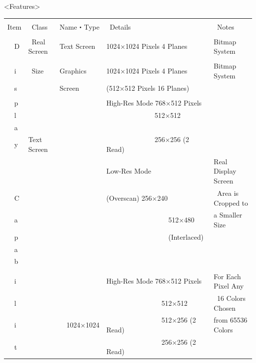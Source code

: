 ﻿\documentclass[twoside,a4paper,12pt]{article}
\begin{document}
\newpage

<Features>

\setlength{\tabcolsep}{0.5mm}
\begin{tabular}{|p{13mm}|p{23mm}|p{4mm}|p{20mm}|p{65mm}|p{36mm}|}
\hline
& & \multicolumn{2}{l|}{} & &\\[-2mm]
Item & \ Class & \multicolumn{2}{l|}{Name・Type} & \ Details & \ Notes\\[1mm]
\hline
& & \multicolumn{2}{l|}{} & &\\[-1mm]
\ \ D & \ Real Screen & \multicolumn{2}{l|}{Text Screen} & 1024×1024 Pixels 4 Planes & Bitmap System\\
\cline{3-6}
& & \multicolumn{2}{l|}{} & &\\[-4mm]
\ \ i & \ Size & \multicolumn{2}{l|}{Graphics} & 1024×1024 Pixels 4 Planes & Bitmap System\\
\ \ s & & \multicolumn{2}{l|}{Screen} & (512×512 Pixels 16 Planes) &\\
\cline{2-6}
& & \multicolumn{2}{l|}{} & &\\[-4mm]
\ \ p & & \multicolumn{2}{l|}{} & High-Res Mode 768×512 Pixels &\\
\ \ l & & \multicolumn{2}{l|}{} & \ \ \ \ \ \ \ \ \ \ \ \ \ \ 512×512 &\\
\ \ a & & \multicolumn{2}{l|}{} & &\\
\ \ y & Text Screen & \multicolumn{2}{l|}{} & \ \ \ \ \ \ \ \ \ \ \ \ \ \ 256×256 (2 Read) &\\
& & \multicolumn{2}{l|}{} & Low-Res Mode & Real Display Screen\\
\ \ C & & \multicolumn{2}{l|}{} & (Overscan) 256×240 & \ Area is Cropped to\\
\ \ a & & \multicolumn{2}{l|}{} & \ \ \ \ \ \ \ \ \ \ \ \ \ \ \ \ \ \ 512×480 & a Smaller Size\\
\ \ p & & \multicolumn{2}{l|}{} & \ \ \ \ \ \ \ \ \ \ \ \ \ \ \ \ \ \ (Interlaced) &\\
\ \ a & & \multicolumn{2}{l|}{} & &\\
\ \ b & & \multicolumn{2}{l|}{} & &\\
\cline{2-6}
& & & & &\\[-4mm]
\ \ i & & & & High-Res Mode 768×512 Pixels & For Each Pixel Any\\
\ \ l & & & & \ \ \ \ \ \ \ \ \ \ \ \ \ \ \ \ 512×512 & \ 16 Colors Chosen\\
\ \ i & & & 1024×1024 & \ \ \ \ \ \ \ \ \ \ \ \ \ \ \ \ 512×256 (2 Read) & from 65536 Colors\\
\ \ t & & & & \ \ \ \ \ \ \ \ \ \ \ \ \ \ \ \ 256×256 (2 Read) &\\

\end{tabular}
\end{document}
